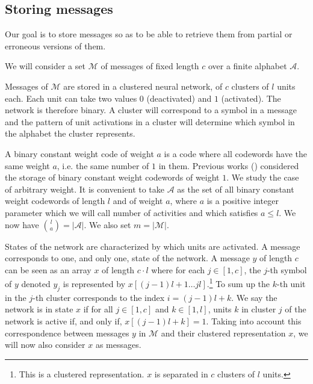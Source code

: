 \documentclass[english,10pt,twocolumn]{IEEEtran}
\renewcommand{\le}{\leqslant}
\theoremstyle{definition}
\begin{document}
	
	\subsection{Storing messages}
	
	Our goal is to store messages so as to be able to retrieve them from partial or erroneous versions of them.
	
	We will consider a set $\mathcal{M}$ of messages of fixed length $c$ over a finite alphabet $\mathcal{A}$.
	
	Messages of $\mathcal{M}$ are stored in a clustered neural network, of $c$ clusters of $l$ units each. Each unit can take two values $0$ (deactivated) and $1$ (activated). The network is therefore binary. A cluster will correspond to a symbol in a message and the pattern of unit activations in a cluster will determine which symbol in the alphabet the cluster represents. 
	
	A binary constant weight code of weight $a$ is a code where all codewords have the same weight $a$, i.e. the same number of $1$ in them. Previous works (\cite{GriBer20114, GriBer20122}) considered the storage of binary constant weight codewords of weight $1$. We study the case of arbitrary weight. It is convenient to take $\mathcal{A}$ as the set of all binary constant weight codewords of length $l$ and of weight $a$, where $a$ is a positive integer parameter which we will call number of activities and which satisfies $a\le l$. We now have ${l \choose a} = |\mathcal{A}|$. We also set $m = | \mathcal{M} |$.
	
	 
	
	
	States of the network are characterized by which units are activated. A message corresponds to one, and only one, state of the network. A message $y$ of length $c$ can be seen as an array $x$ of length $c\cdot{} l$ where for each $j\in [1,c]$, the $j$-th symbol of $y$ denoted $y_j$ is represented by $x[(j-1)l+1\hdots jl]$.\footnote{This is a clustered representation. $x$ is separated in $c$ clusters of $l$ units.} To sum up the $k$-th unit in the $j$-th cluster corresponds to the index $i = (j-1)l+k$. We say the network is in state $x$ if for all $j\in [1, c]$ and $k\in [1,l]$, units $k$ in cluster $j$ of the network is active if, and only if, $x[(j-1)l+k] = 1$. Taking into account this correspondence between messages $y$ in $\mathcal{M}$ and their clustered representation $x$, we will now also consider $x$ as messages.
	
\end{document}
